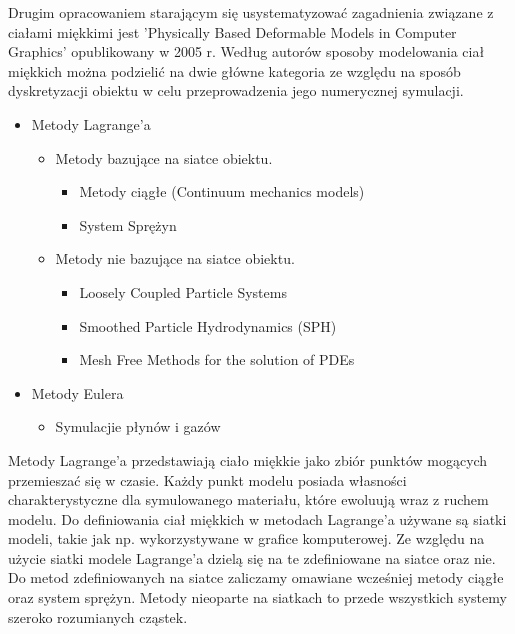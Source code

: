 Drugim opracowaniem starającym się usystematyzować zagadnienia związane z
ciałami miękkimi jest 'Physically Based Deformable Models in Computer
Graphics' opublikowany w 2005 r. Według autorów sposoby modelowania ciał miękkich można
podzielić na dwie główne kategoria ze względu na sposób dyskretyzacji
obiektu w celu przeprowadzenia jego numerycznej symulacji.

\begin{itemize}
\item Metody Lagrange'a
	\begin{itemize}
	\item Metody bazujące na siatce obiektu.
		\begin{itemize}
			\item Metody ciągłe (Continuum mechanics models)
			\item System Sprężyn
		\end{itemize}
	\item Metody nie bazujące na siatce obiektu.
		\begin{itemize}
			\item Loosely Coupled Particle Systems 
			\item Smoothed Particle Hydrodynamics (SPH) 
			\item Mesh Free Methods for the solution of PDEs 
		\end{itemize}
	\end{itemize}
\item Metody Eulera
	\begin{itemize}
		\item Symulacjie płynów i gazów
	\end{itemize}
\end{itemize}

Metody Lagrange'a przedstawiają ciało miękkie jako zbiór punktów mogących
przemieszać się w czasie. Każdy punkt modelu posiada własności
charakterystyczne dla symulowanego materiału, które ewoluują wraz z ruchem
modelu\cite{pbdo}. Do definiowania ciał miękkich w metodach Lagrange'a
używane są siatki modeli, takie jak np. wykorzystywane w grafice komputerowej. 
Ze względu na użycie siatki modele Lagrange'a dzielą się na te zdefiniowane na
siatce oraz nie. Do metod zdefiniowanych na siatce zaliczamy omawiane wcześniej 
metody ciągłe oraz system sprężyn. Metody nieoparte na siatkach to przede
wszystkich systemy szeroko rozumianych cząstek.

